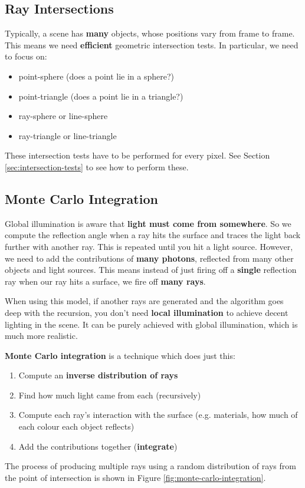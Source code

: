 \documentclass{article}
\begin{document}
\subsection{Ray Intersections}

Typically, a scene has \textbf{many} objects, whose positions vary from frame to frame. This means we need \textbf{efficient} geometric intersection tests. In particular, we need to focus on:
\begin{itemize}
	\item point-sphere (does a point lie in a sphere?)
	\item point-triangle (does a point lie in a triangle?)
	\item ray-sphere or line-sphere
	\item ray-triangle or line-triangle
\end{itemize}
These intersection tests have to be performed for every pixel. See Section \ref{sec:intersection-tests} to see how to perform these.

\subsection{Monte Carlo Integration}

Global illumination is aware that \textbf{light must come from somewhere}. So we compute the reflection angle when a ray hits the surface and traces the light back further with another ray. This is repeated until you hit a light source. However, we need to add the contributions of \textbf{many photons}, reflected from many other objects and light sources. This means instead of just firing off a \textbf{single} reflection ray when our ray hits a surface, we fire off \textbf{many rays}.

When using this model, if another rays are generated and the algorithm goes deep with the recursion, you don't need \textbf{local illumination} to achieve decent lighting in the scene. It can be purely achieved with global illumination, which is much more realistic.

\textbf{Monte Carlo integration} is a technique which does just this:
\begin{enumerate}
	\item Compute an \textbf{inverse distribution of rays}
	\item Find how much light came from each (recursively)
	\item Compute each ray's interaction with the surface (e.g. materials, how much of each colour each object reflects)
	\item Add the contributions together (\textbf{integrate})
\end{enumerate}
The process of producing multiple rays using a random distribution of rays from the point of intersection is shown in Figure \ref{fig:monte-carlo-integration}.
\end{document}
